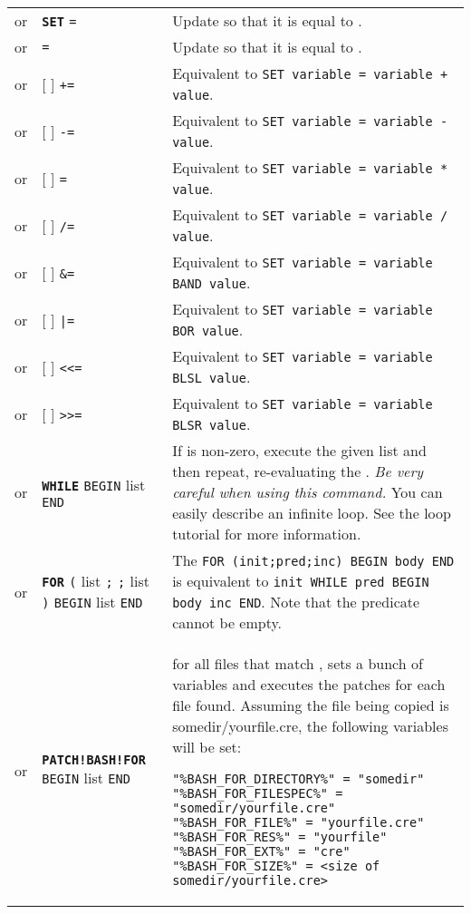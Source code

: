 \documentclass{article}
\def\ttref#1{\ahrefloc{#1}{\tt #1}}
\def\DEFINE#1{{\tt \bf #1}\label{#1}\index{#1}}
\def\DEFSYN#1{{\tt \bf #1}\index{#1}}
\def\t#1{{\tt #1}}
\def\Slist{{\color{red} list }}
\def\Ob{{\color{red} [ }}
\def\Oe{{\color{red} ] }}
\begin{document}
\begin{tabular}{cp{10in}|p{10in}}
or & \DEFINE{SET} \ttref{variable} \t{=} \ttref{value} &
  Update \ttref{variable} so that it is equal to \ttref{value}. \\
or & \ttref{variable} \t{=} \ttref{value} &
  Update \ttref{variable} so that it is equal to \ttref{value}. \\
or & \Ob \ttref{SET} \Oe \ttref{variable} \t{+=} \ttref{value} &
  Equivalent to \t{SET variable = variable + value}. \\
or & \Ob \ttref{SET} \Oe \ttref{variable} \t{-=} \ttref{value} &
  Equivalent to \t{SET variable = variable - value}. \\
or & \Ob \ttref{SET} \Oe \ttref{variable} \t{*=} \ttref{value} &
  Equivalent to \t{SET variable = variable * value}. \\
or & \Ob \ttref{SET} \Oe \ttref{variable} \t{/=} \ttref{value} &
  Equivalent to \t{SET variable = variable / value}. \\
or & \Ob \ttref{SET} \Oe \ttref{variable} \t{\&=} \ttref{value} &
  Equivalent to \t{SET variable = variable BAND value}. \\
or & \Ob \ttref{SET} \Oe \ttref{variable} \t{|=} \ttref{value} &
  Equivalent to \t{SET variable = variable BOR value}. \\
or & \Ob \ttref{SET} \Oe \ttref{variable} \t{<<=} \ttref{value} &
  Equivalent to \t{SET variable = variable BLSL value}. \\
or & \Ob \ttref{SET} \Oe \ttref{variable} \t{>>=} \ttref{value} &
  Equivalent to \t{SET variable = variable BLSR value}. \\

or & \DEFSYN{WHILE} \ttref{value} \t{BEGIN}
  \ttref{patch} \Slist \t{END} &
  If \ttref{value} is non-zero, execute the given \ttref{patch} \Slist and
  then repeat, re-evaluating the \ttref{value}.
  {\em Be very careful when using this command. } You can easily describe
  an infinite loop. See the \ttref{WHILE} loop tutorial for more
  information.
  \\
or & \DEFINE{FOR} \t{(} \ttref{patch} \Slist \t{;}
                        \ttref{value} \t{;}
                        \ttref{patch} \Slist \t{)}
                  \t{BEGIN} \ttref{patch} \Slist \t{END} &
  The \ttref{patch} \t{FOR (init;pred;inc) BEGIN body END} is equivalent to
  \t{init WHILE pred BEGIN body inc END}. Note that the predicate
  \ttref{value} cannot be empty.  \\
or & \DEFINE{PATCH!BASH!FOR} \ttref{directory-file-regexp} \t{BEGIN} \ttref{patch} \Slist \t{END} &
  for all files that match \ttref{directory-file-regexp}, sets a bunch of variables
  and executes the patches for each file found. Assuming the file being copied
  is somedir/yourfile.cre, the following variables will be set:
\begin{verbatim}
"%BASH_FOR_DIRECTORY%" = "somedir"
"%BASH_FOR_FILESPEC%" = "somedir/yourfile.cre"
"%BASH_FOR_FILE%" = "yourfile.cre"
"%BASH_FOR_RES%" = "yourfile"
"%BASH_FOR_EXT%" = "cre"
"%BASH_FOR_SIZE%" = <size of somedir/yourfile.cre>
\end{verbatim}            \\


\end{tabular}
\end{document}
